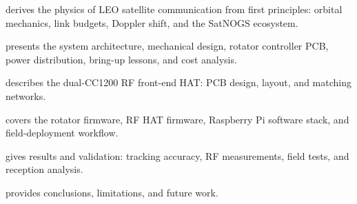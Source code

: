 \begin{description}[style=unboxed, leftmargin=0pt]
    \item[Chapter~\ref{ch:background}] derives the physics of LEO satellite communication from first principles: orbital mechanics, link budgets, Doppler shift, and the SatNOGS ecosystem.
    \item[Chapter~\ref{ch:system-design}] presents the system architecture, mechanical design, rotator controller PCB, power distribution, bring-up lessons, and cost analysis.
    \item[Chapter~\ref{ch:rf-frontend}] describes the dual-CC1200 RF front-end HAT: PCB design, layout, and matching networks.
    \item[Chapter~\ref{ch:firmware-software}] covers the rotator firmware, RF HAT firmware, Raspberry Pi software stack, and field-deployment workflow.
    \item[Chapter~\ref{ch:results}] gives results and validation: tracking accuracy, RF measurements, field tests, and reception analysis.
    \item[Chapter~\ref{ch:conclusion}] provides conclusions, limitations, and future work.
\end{description}

